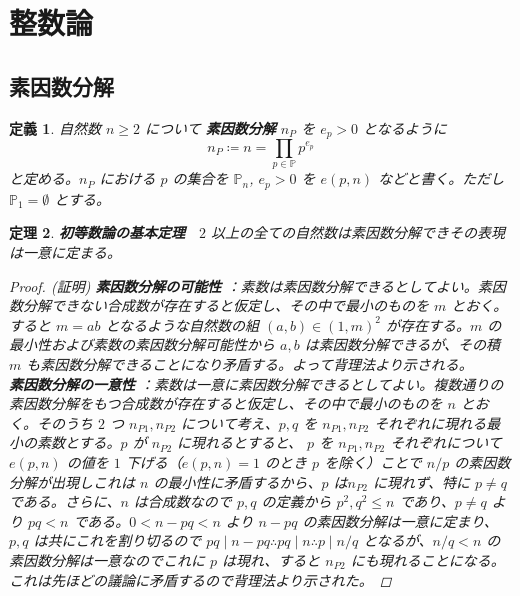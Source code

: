 \documentclass[12pt, a4j]{ltjsarticle}
\newtheorem{thm}{定理}
\newtheorem{defi}[thm]{定義}
\begin{document}
\newpage
\section{整数論}
\subsection{素因数分解}
\begin{defi}
自然数 $n\ge2$ について {\bf 素因数分解} $n_P$ を $e_p>0$ となるように
\begin{equation}
n_P \coloneqq n = \displaystyle\prod_{p\in\mathbb{P}}p^{e_p}
\end{equation}
\hspace{\fill} と定める。$n_P$ における $p$ の集合を $\mathbb{P}_n$, $e_p>0$ を $e(p,n)$ などと書く。ただし $\mathbb{P}_1 = \emptyset$ とする。
\end{defi}

\vspace{1cm}

\begin{thm} {\bf 初等数論の基本定理}　$2$ 以上の全ての自然数は素因数分解できその表現は一意に定まる。
  \begin{proof}
  (証明) {\bf 素因数分解の可能性} ：素数は素因数分解できるとしてよい。素因数分解できない合成数が存在すると仮定し、その中で最小のものを $m$ とおく。すると $m=ab$ となるような自然数の組 $(a,b)\in (1,m)^2$ が存在する。$m$ の最小性および素数の素因数分解可能性から $a,b$ は素因数分解できるが、その積 $m$ も素因数分解できることになり矛盾する。よって背理法より示される。\\{\bf 素因数分解の一意性} ：素数は一意に素因数分解できるとしてよい。複数通りの素因数分解をもつ合成数が存在すると仮定し、その中で最小のものを $n$ とおく。そのうち $2$ つ $n_{P1}, n_{P2}$ について考え、$p, q$ を $n_{P1}, n_{P2}$ それぞれに現れる最小の素数とする。$p$ が $n_{P2}$ に現れるとすると、 $p$ を $n_{P1}, n_{P2}$
  それぞれについて $e(p, n)$ の値を $1$ 下げる（$e(p, n)=1$ のとき $p$ を除く）ことで $n/p$ の素因数分解が出現しこれは $n$ の最小性に矛盾するから、$p$ は$n_{P2}$ に現れず、特に $p \neq q$ である。さらに、$n$ は合成数なので $p, q$ の定義から $p^2,q^2 \le n$ であり、$p \neq q$ より $pq < n$ である。$0 < n - pq < n$ より $n - pq$ の素因数分解は一意に定まり、$p,q$ は共にこれを割り切るので $pq \mid n-pq \therefore pq \mid n \therefore p \mid n/q$ となるが、$n/q<n$ の素因数分解は一意なのでこれに $p$ は現れ、すると $n_{P2}$ にも現れることになる。これは先ほどの議論に矛盾するので背理法より示された。

  \end{proof}
\end{thm}
\end{document}
